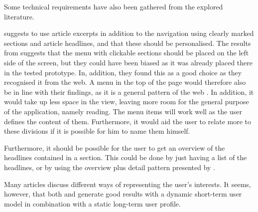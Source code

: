 Some technical requirements have also been gathered from the explored literature.

\cite{fulltext.pdf} suggests to use article excerpts in addition to the navigation using clearly marked sections and article headlines, and that these should be personalised. The results from \cite{kristin-fredrik.pdf} suggests that the menu with clickable sections should be placed on the left side of the screen, but they could have been biased as it was already placed there in the tested prototype. In, addition, they found this as a good choice as they recognised it from the web. A menu in the top of the page would therefore also be in line with their findings, as it is a general pattern of the web \cite{Tidwell}. In addition, it would take up less space in the view, leaving more room for the general purpose of the application, namely reading. The menu items will work well as the user defines the content of them. Furthermore, it would aid the user to relate more to these divisions if it is possible for him to name them himself.

Furthermore, it should be possible for the user to get an overview of the headlines contained in a section. This could be done by just having a list of the headlines, or by using the overview plus detail pattern presented by \cite{Tidwell}.

Many articles discuss different ways of representing the user's interests. It seems, however, that both \cite{fulltext.pdf} and \cite{User-Modeling-for-Adaptive-News-Access.pdf} generate good results with a dynamic short-term user model in combination with a static long-term user profile.

